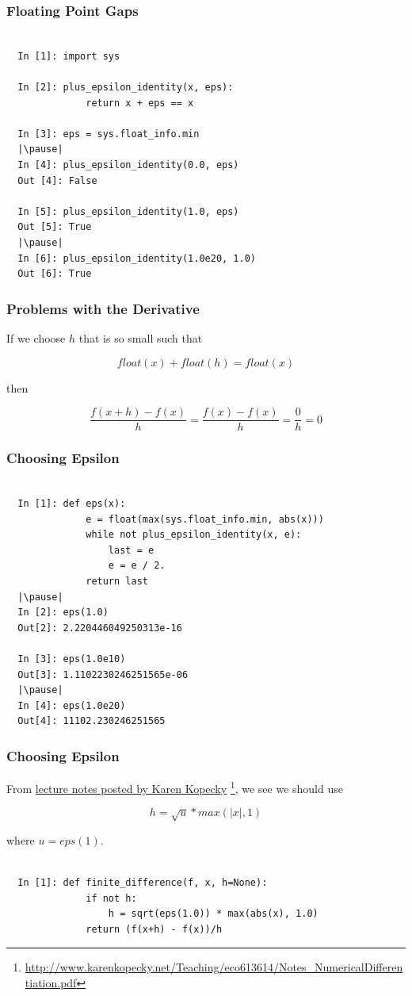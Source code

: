 \documentclass{beamer}
\def\abs#1{| #1 |}
\begin{document}
\begin{frame}[fragile]
\frametitle{Floating Point Gaps}

\begin{lstlisting}

  In [1]: import sys

  In [2]: plus_epsilon_identity(x, eps):
              return x + eps == x

  In [3]: eps = sys.float_info.min
  |\pause|
  In [4]: plus_epsilon_identity(0.0, eps)
  Out [4]: False

  In [5]: plus_epsilon_identity(1.0, eps)
  Out [5]: True
  |\pause|
  In [6]: plus_epsilon_identity(1.0e20, 1.0)
  Out [6]: True

\end{lstlisting}

\end{frame}

\begin{frame}
\frametitle{Problems with the Derivative}

If we choose $h$ that is so small such that

\[ float(x) + float(h) = float(x) \]
\pause

then

\[ \frac{f(x+h) - f(x)}{h} = \frac{f(x) - f(x)}{h} = \frac{0}{h} = 0 \]

\end{frame}


\begin{frame}[fragile]
\frametitle{Choosing Epsilon}

\begin{lstlisting}

  In [1]: def eps(x):
              e = float(max(sys.float_info.min, abs(x)))
              while not plus_epsilon_identity(x, e):
                  last = e
                  e = e / 2.
              return last
  |\pause|
  In [2]: eps(1.0)
  Out[2]: 2.220446049250313e-16

  In [3]: eps(1.0e10)
  Out[3]: 1.1102230246251565e-06
  |\pause|
  In [4]: eps(1.0e20)
  Out[4]: 11102.230246251565
\end{lstlisting}

\end{frame}

\begin{frame}[fragile]
\frametitle{Choosing Epsilon}

From \href{http://www.karenkopecky.net/Teaching/eco613614/Notes_NumericalDifferentiation.pdf}{lecture notes posted by Karen Kopecky} \footnote{\url{http://www.karenkopecky.net/Teaching/eco613614/Notes_NumericalDifferentiation.pdf}}, we see we should use

\[ h = \sqrt{u} * max(\abs{x}, 1) \]

where $u = eps(1)$.
\pause
\begin{lstlisting}

  In [1]: def finite_difference(f, x, h=None):
              if not h:
                  h = sqrt(eps(1.0)) * max(abs(x), 1.0)
              return (f(x+h) - f(x))/h

\end{lstlisting}

\end{frame}
\end{document}
